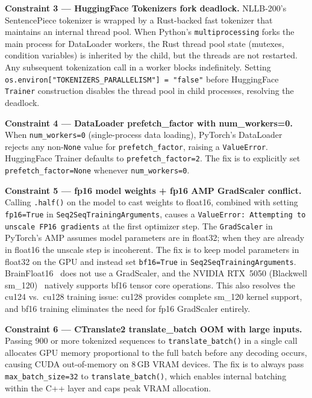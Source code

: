 \documentclass[conference]{IEEEtran}
\begin{document}
\textbf{Constraint 3 --- HuggingFace Tokenizers fork deadlock.}
NLLB-200's SentencePiece tokenizer is wrapped by a Rust-backed fast tokenizer
that maintains an internal thread pool. When Python's \texttt{multiprocessing}
forks the main process for DataLoader workers, the Rust thread pool state
(mutexes, condition variables) is inherited by the child, but the threads are not
restarted. Any subsequent tokenization call in a worker blocks indefinitely.
Setting \texttt{os.environ["TOKENIZERS\_PARALLELISM"] = "false"} before
HuggingFace \texttt{Trainer} construction disables the thread pool in child
processes, resolving the deadlock.

\textbf{Constraint 4 --- DataLoader prefetch\_factor with num\_workers=0.}
When \texttt{num\_workers=0} (single-process data loading), PyTorch's DataLoader
rejects any non-\texttt{None} value for \texttt{prefetch\_factor}, raising a
\texttt{ValueError}. HuggingFace Trainer defaults to \texttt{prefetch\_factor=2}.
The fix is to explicitly set \texttt{prefetch\_factor=None} whenever
\texttt{num\_workers=0}.

\textbf{Constraint 5 --- fp16 model weights + fp16 AMP GradScaler conflict.}
Calling \texttt{.half()} on the model to cast weights to float16, combined with
setting \texttt{fp16=True} in \texttt{Seq2SeqTrainingArguments}, causes a
\texttt{ValueError: Attempting to unscale FP16 gradients} at the first optimizer step.
The \texttt{GradScaler} in PyTorch's AMP assumes model parameters are in float32; when
they are already in float16 the unscale step is incoherent.
The fix is to keep model parameters in float32 on the GPU and instead set
\texttt{bf16=True} in \texttt{Seq2SeqTrainingArguments}. BrainFloat16~\cite{micikevicius2018mixed}
does not use a GradScaler, and the NVIDIA RTX~5050 (Blackwell sm\_120)~\cite{nvidia_blackwell}
natively supports bf16 tensor core operations. This also resolves the cu124 vs.\ cu128
training issue: cu128 provides complete sm\_120 kernel support, and bf16 training
eliminates the need for fp16 GradScaler entirely.

\textbf{Constraint 6 --- CTranslate2 translate\_batch OOM with large inputs.}
Passing 900 or more tokenized sequences to \texttt{translate\_batch()} in a single
call allocates GPU memory proportional to the full batch before any decoding occurs,
causing CUDA out-of-memory on 8\,GB VRAM devices.
The fix is to always pass \texttt{max\_batch\_size=32} to \texttt{translate\_batch()},
which enables internal batching within the C++ layer and caps peak VRAM allocation.
\end{document}
